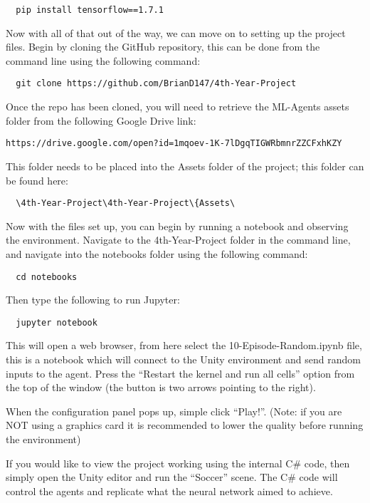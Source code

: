 \begin{flushleft}
\begin{verbatim}
  pip install tensorflow==1.7.1
\end{verbatim}

Now with all of that out of the way, we can move on to setting up the project files. Begin by cloning the GitHub repository, this can be done from the command line using the following command:

\begin{verbatim}
  git clone https://github.com/BrianD147/4th-Year-Project
\end{verbatim}

Once the repo has been cloned, you will need to retrieve the ML-Agents assets folder from the following Google Drive link: 

\begin{verbatim}
https://drive.google.com/open?id=1mqoev-1K-7lDgqTIGWRbmnrZZCFxhKZY
\end{verbatim}

This folder needs to be placed into the Assets folder of the project; this folder can be found here:

\begin{verbatim}
  \4th-Year-Project\4th-Year-Project\{Assets\
\end{verbatim}

Now with the files set up, you can begin by running a notebook and observing the environment. Navigate to the 4th-Year-Project folder in the command line, and navigate into the notebooks folder using the following command:

\begin{verbatim}
  cd notebooks
\end{verbatim}

Then type the following to run Jupyter:

\begin{verbatim}
  jupyter notebook
\end{verbatim}

This will open a web browser, from here select the 10-Episode-Random.ipynb file, this is a notebook which will connect to the Unity environment and send random inputs to the agent. Press the “Restart the kernel and run all cells” option from the top of the window (the button is two arrows pointing to the right).

When the configuration panel pops up, simple click “Play!”. (Note: if you are NOT using a graphics card it is recommended to lower the quality before running the environment)

If you would like to view the project working using the internal C\# code, then simply open the Unity editor and run the “Soccer” scene. The C\# code will control the agents and replicate what the neural network aimed to achieve.
\end{flushleft}